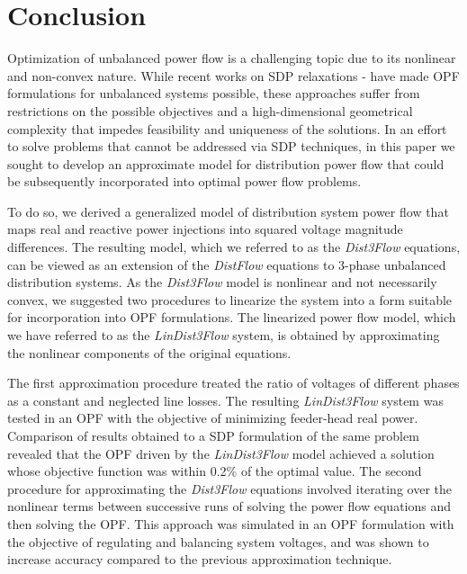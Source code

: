 \section{Conclusion}
\label{sec:conclusions}

Optimization of unbalanced power flow is a challenging topic due to its nonlinear and non-convex nature. While recent works on SDP relaxations  \cite{dall2012optimization} - \cite{dall2013distributed} have made OPF formulations for unbalanced systems possible, these approaches suffer from restrictions on the possible objectives and a high-dimensional geometrical complexity that impedes feasibility and uniqueness of the solutions.  In an effort to solve problems that cannot be addressed via SDP techniques, in this paper we sought to develop an approximate model for distribution power flow that could be subsequently incorporated into optimal power flow problems.  

To do so, we derived a generalized model of distribution system power flow that maps real and reactive power injections into squared voltage magnitude differences.  The resulting model, which we referred to as the \textit{Dist3Flow} equations, can be viewed as an extension of the \textit{DistFlow} \cite{baran1989optimal} equations to 3-phase unbalanced distribution systems.  As the \textit{Dist3Flow} model is nonlinear and not necessarily convex, we suggested two procedures to linearize the system into a form suitable for incorporation into OPF formulations.  The linearized power flow model, which we have referred to as the \textit{LinDist3Flow} system, is obtained by approximating the nonlinear components of the original equations.  

The first approximation procedure treated the ratio of voltages of different phases as a constant and neglected line losses.  The resulting \textit{LinDist3Flow} system was tested in an OPF with the objective of minimizing feeder-head real power.  Comparison of results obtained to a SDP formulation of the same problem revealed that the OPF driven by the \emph{LinDist3Flow} model achieved a solution whose objective function was within 0.2\% of the optimal value.
The second procedure for approximating the \textit{Dist3Flow} equations involved iterating over the nonlinear terms between successive runs of solving the power flow equations and then solving the OPF.  This approach was simulated in an OPF formulation with the objective of regulating and balancing system voltages, and was shown to increase accuracy compared to the previous approximation technique. 

